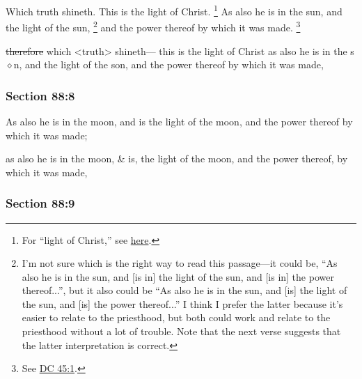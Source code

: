 		Which truth shineth. This is the light of Christ.%
			\footnote{%
				For ``light of Christ,'' see \hyperref[LIGHT-PHRASES]{here}.
				}
		As also he is in the sun, and the light of the sun,%
			\footnote{%
				I'm not sure which is the right way to read this passage---it could be, ``As also he is in the sun, and [is in] the light of the sun, and [is in] the power thereof...'', but it also could be ``As also he is in the sun, and [is] the light of the sun, and [is] the power thereof...'' I think I prefer the latter because it's easier to relate to the priesthood, but both could work and relate to the priesthood without a lot of trouble. Note that the next verse suggests that the latter interpretation is correct.
				}
		and the power thereof by which it was made.%
			\footnote{%
				See \hyperref[DC45-1]{DC 45:1}.
				}

		\begin{framed}
		\scriptsize
			\begin{compactdesc}
				\item[JSP] \sout{therefore} which <truth> shineth--- this is the light of Christ as also he is in the s$\diamond$n, and the light of the son, and the power thereof by which it was made,
			\end{compactdesc}
		\end{framed}

	\subsubsection{Section 88:8} %
		\label{DC88-8}

		As also he is in the moon, and is the light of the moon, and the power thereof by which it was made;

		\begin{framed}
		\scriptsize
			\begin{compactdesc}
				\item[JSP] as also he is in the moon, \& is, the light of the moon, and the power thereof, by which it was made,
			\end{compactdesc}
		\end{framed}

	\subsubsection{Section 88:9} %
		\label{DC88-9}

